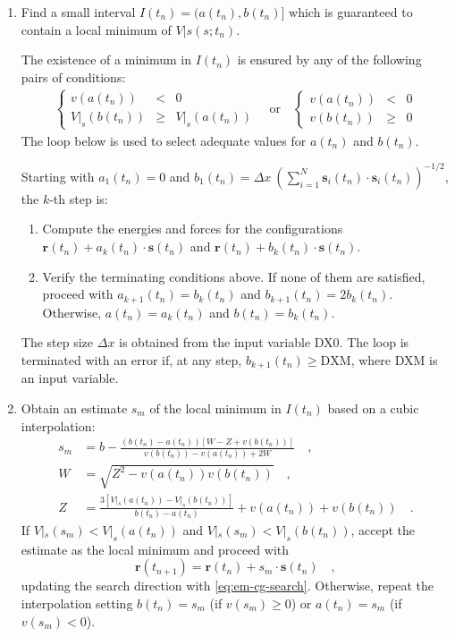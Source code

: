 \documentclass[10pt,a4paper,openany]{memoir}
\numberwithin{equation}{section}
\newcommand{\ssub}[1]{\mathbf{s}_{#1}}
\begin{document}
\begin{enumerate}
\item Find a small interval $I(t_n)=(a(t_n), b(t_n)]$ which is guaranteed to contain a local minimum of $V|s(s;t_n)$.
  \par
  The existence of a minimum in $I(t_n)$ is ensured by any of the following pairs of conditions:
  \begin{align*}
    \left\{
    \begin{array}{rcl}
      v(a(t_n)) & < &0 \\
     V|_s(b(t_n)) & \geq &V|_s(a(t_n))
      \end{array}\right.
               \quad\text{or}\quad
      \left\{
      \begin{array}{rcl}
        v(a(t_n)) & < & 0 \\
        v(b(t_n)) & \geq & 0
      \end{array}\right.
  \end{align*}
  The loop below is used to select adequate values for $a(t_n)$ and $b(t_n)$.
  
  Starting with $a_1(t_n) = 0$ and $b_1(t_n) = \Delta x\ (\sum_{i=1}^N \ssub{i}(t_n)\cdot\ssub{i}(t_n))^{-1/2}$, the $k$-th step is:
  \begin{enumerate}
  \item Compute the energies and forces for the configurations $\mathbf{r}(t_n) + a_k(t_n)\cdot\mathbf{s}(t_n)$ and $\mathbf{r}(t_n) + b_k(t_n)\cdot\mathbf{s}(t_n)$.
  \item Verify the terminating conditions above. If none of them are satisfied, proceed with $a_{k+1}(t_n) = b_{k}(t_n)$ and $b_{k+1}(t_n)=2b_k(t_n)$.
    Otherwise, $a(t_n) = a_k(t_n)$ and $b(t_n) = b_k(t_n)$.
  \end{enumerate}
  The step size $\Delta x$ is obtained from the input variable DX0.
  The loop is terminated with an error if, at any step, $b_{k+1}(t_n) \geq \text{DXM}$, where DXM is an input variable.
\item Obtain an estimate $s_{m}$ of the local minimum in $I(t_n)$ based on a cubic interpolation:
  \begin{align}
    \label{eq:em-cg-interp}
    s_m & = b - \frac{(b(t_n) - a(t_n))[W-Z+v(b(t_n))]}{v(b(t_n)) - v(a(t_n)) + 2W} \quad ,\\ \nonumber
    W & = \sqrt{Z^2-v(a(t_n))v(b(t_n))} \quad , \\ \nonumber
    Z & = \frac{3[V|_s(a(t_n)) - V|_s(b(t_n))]}{b(t_n) - a(t_n)} + v(a(t_n)) + v(b(t_n)) \quad .
  \end{align}
  If $V|_s(s_{m}) < V|_s(a(t_n))$ and $V|_s(s_{m}) < V|_s(b(t_n))$, accept the estimate as the local minimum and proceed with
  \begin{equation}
    \label{eq:em-cg-step}
    \mathbf{r}(t_{n+1}) = \mathbf{r}(t_n) + s_m \cdot \mathbf{s}(t_n) \quad ,
  \end{equation}
  updating the search direction with \autoref{eq:em-cg-search}.
  Otherwise, repeat the interpolation setting $b(t_n) = s_m$ (if $v(s_m) \geq 0$) or $a(t_n) = s_m$ (if $v(s_m) <0$).

\end{enumerate}
\end{document}
